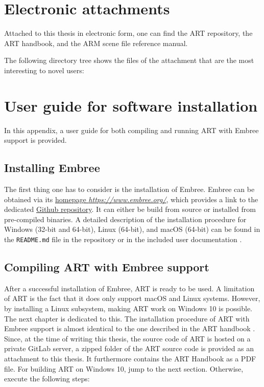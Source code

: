 \chapter{Electronic attachments} \label{chap:attachments}

Attached to this thesis in electronic form, one can find the ART repository, the ART handbook, and the ARM scene file reference manual.

The following directory tree shows the files of the attachment that are the most interesting to novel users:

\medspace


\chapter{User guide for software installation}

In this appendix, a user guide for both compiling and running ART with Embree support is provided. 

\section{Installing Embree}
\label{sec:embree_app}
The first thing one has to consider is the installation of Embree. Embree can be obtained via its \href{https://www.embree.org/}{homepage \emph{https://www.embree.org/}}, which provides a link to the dedicated \href{https://github.com/embree/embree}{Github repository}. It can either be build from source or installed from pre-compiled binaries. A detailed description of the installation procedure for Windows (32-bit and 64-bit), Linux (64-bit), and macOS (64-bit) can be found in the \texttt{README.md} file in the repository or in the included user documentation \cite{embree2021Doc}.

\section{Compiling ART with Embree support}
\label{art}
After a successful installation of Embree, ART is ready to be used. A limitation of ART is the fact that it does only support macOS and Linux systems. However, by installing a Linux subsystem, making ART work on Windows 10 is possible. The next chapter is dedicated to this.
The installation procedure of ART with Embree support is almost identical to the one described in the ART handbook \cite{arthandbook}. Since, at the time of writing this thesis, the source code of ART is hosted on a private GitLab server, a zipped folder of the ART source code is provided as an attachment to this thesis. It furthermore contains the ART Handbook as a PDF file. For building ART on Windows 10, jump to the next section. Otherwise, execute the following steps:

